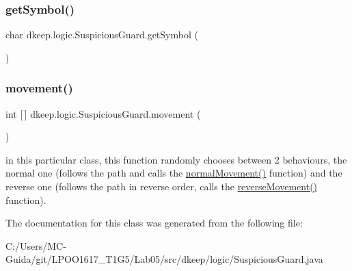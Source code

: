 \subsubsection{\texorpdfstring{get\+Symbol()}{getSymbol()}}
{\footnotesize\ttfamily char dkeep.\+logic.\+Suspicious\+Guard.\+get\+Symbol (\begin{DoxyParamCaption}{ }\end{DoxyParamCaption})}

\mbox{\label{classdkeep_1_1logic_1_1_suspicious_guard_a10c4b42ec52624f5f4fbc8f38bb4faf1}} 
\subsubsection{\texorpdfstring{movement()}{movement()}}
{\footnotesize\ttfamily int \mbox{[}$\,$\mbox{]} dkeep.\+logic.\+Suspicious\+Guard.\+movement (\begin{DoxyParamCaption}{ }\end{DoxyParamCaption})}

in this particular class, this function randomly chooses between 2 behaviours, the normal one (follows the path and calls the \hyperlink{classdkeep_1_1logic_1_1_guard_a2389016085c6d65d4366930fac72dab4}{normal\+Movement()} function) and the reverse one (follows the path in reverse order, calls the \hyperlink{classdkeep_1_1logic_1_1_guard_a8c588aa887fcfe6d3e4a9e13d236c644}{reverse\+Movement()} function). 

The documentation for this class was generated from the following file\+:\begin{DoxyCompactItemize}
\item 
C\+:/\+Users/\+M\+C-\/\+Guida/git/\+L\+P\+O\+O1617\+\_\+\+T1\+G5/\+Lab05/src/dkeep/logic/Suspicious\+Guard.\+java\end{DoxyCompactItemize}
